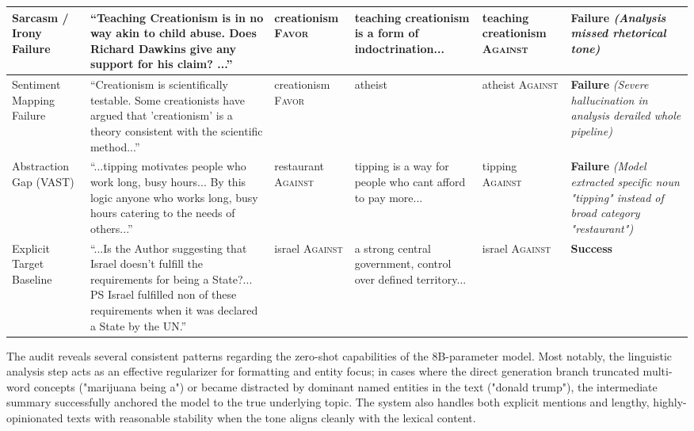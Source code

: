 \documentclass[conference]{IEEEtran}
\begin{document}
\begin{table}[htbp]
\begin{tabular}{|p{}|p{}|p{}|p{}|p{}|p{}|}
\hline
Sarcasm / Irony Failure & ``Teaching Creationism is in no way akin to child abuse. Does Richard Dawkins give any support for his claim? ...'' & creationism \newline \textsc{Favor} & teaching creationism is a form of indoctrination... & teaching creationism \newline \textsc{Against} & \textbf{Failure} \newline \textit{(Analysis missed rhetorical tone)} \\
\hline
Sentiment Mapping Failure & ``Creationism is scientifically testable. Some creationists have argued that 'creationism' is a theory consistent with the scientific method...'' & creationism \newline \textsc{Favor} & atheist & atheist \newline \textsc{Against} & \textbf{Failure} \newline \textit{(Severe hallucination in analysis derailed whole pipeline)} \\
\hline
Abstraction Gap (VAST) & ``...tipping motivates people who work long, busy hours... By this logic anyone who works long, busy hours catering to the needs of others...'' & restaurant \newline \textsc{Against} & tipping is a way for people who cant afford to pay more... & tipping \newline \textsc{Against} & \textbf{Failure} \newline \textit{(Model extracted specific noun "tipping" instead of broad category "restaurant")} \\
\hline
Explicit Target Baseline & ``...Is the Author suggesting that Israel doesn't fulfill the requirements for being a State?... PS Israel fulfilled non of these requirements when it was declared a State by the UN.'' & israel \newline \textsc{Against} & a strong central government, control over defined territory... & israel \newline \textsc{Against} & \textbf{Success} \\
\hline
\end{tabular}
\end{table}

The audit reveals several consistent patterns regarding the zero-shot capabilities of the 8B-parameter model. Most notably, the linguistic analysis step acts as an effective regularizer for formatting and entity focus; in cases where the direct generation branch truncated multi-word concepts ("marijuana being a") or became distracted by dominant named entities in the text ("donald trump"), the intermediate summary successfully anchored the model to the true underlying topic. The system also handles both explicit mentions and lengthy, highly-opinionated texts with reasonable stability when the tone aligns cleanly with the lexical content.
\end{document}
